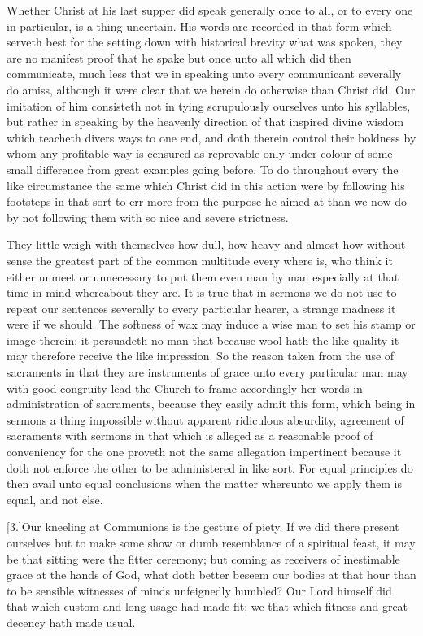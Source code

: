 Whether Christ at his last supper did speak generally once to all, or to every one in particular, is a thing uncertain. His words are recorded in that form which serveth best for the setting down with historical brevity what was spoken, they are no manifest proof that he spake but once unto all which did then communicate, much less that we in speaking unto every communicant severally do amiss, although it were clear that we herein do otherwise than Christ did. Our imitation of him consisteth not in tying scrupulously ourselves unto his syllables, but rather in speaking by the heavenly direction of that inspired divine wisdom which teacheth divers ways to one end, and doth therein control their boldness by whom any profitable way is censured as reprovable only under colour of some small difference from great examples going before. To do throughout every the like circumstance the same which Christ did in this action were by following his footsteps in that sort to err more from the purpose he aimed at than we now do by not following them with so nice and severe strictness.




They little weigh with themselves how dull, how heavy and almost how without sense the greatest part of the common multitude every where is, who think it either unmeet or unnecessary to put them even man by man especially at that time in mind whereabout they are. It is true that in sermons we do not use to repeat our sentences severally to every particular hearer, a strange madness it were if we should. The softness of wax may induce a wise man to set his stamp or image therein; it persuadeth no man that because wool hath the like quality it may therefore receive the like impression. So the reason taken from the use of sacraments in that they are instruments of grace unto every particular man may with good congruity lead the Church to frame accordingly her words in administration of sacraments, because they easily admit this form, which being in sermons a thing impossible without apparent ridiculous absurdity, agreement of sacraments with sermons in that which is alleged as a reasonable proof of conveniency for the one proveth not the same allegation impertinent because it doth not enforce the other to be administered in like sort. For equal principles do then avail unto equal conclusions when the matter whereunto we apply them is equal, and not else.

[3.]Our kneeling at Communions is the gesture of piety. If we did there present ourselves but to make some show or dumb resemblance of a spiritual feast, it may be that sitting  were the fitter ceremony;
 but coming as receivers of inestimable grace at the hands of God, what doth better beseem our bodies at that hour than to be sensible witnesses of minds unfeignedly humbled? Our Lord himself did that which custom and long usage had made fit; we that which fitness and great decency hath made usual.

